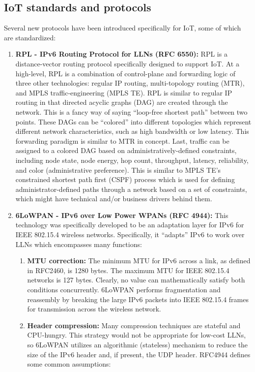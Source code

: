 \subsection{IoT standards and protocols}
Several new protocols have been introduced specifically for IoT, some of which
are standardized:

\begin{enumerate}
  \item \textbf{RPL - IPv6 Routing Protocol for LLNs (RFC 6550):} RPL is a
  distance-vector routing protocol specifically designed to support IoT. At a
  high-level, RPL is a combination of control-plane and forwarding logic of
  three other technologies: regular IP routing, multi-topology routing (MTR),
  and MPLS traffic-engineering (MPLS TE). RPL is similar to regular IP routing
  in that directed acyclic graphs (DAG) are created through the network. This
  is a fancy way of saying ``loop-free shortest path'' between two points.
  These DAGs can be ``colored'' into different topologies which represent
  different network characteristics, such as high bandwidth or low latency.
  This forwarding paradigm is similar to MTR in concept. Last, traffic can be
  assigned to a colored DAG based on administratively-defined constraints,
  including node state, node energy, hop count, throughput, latency,
  reliability, and color (administrative preference). This is similar to MPLS
  TE’s constrained shortest path first (CSPF) process which is used for
  defining administrator-defined paths through a network based on a set of
  constraints, which might have technical and/or business drivers behind them.
  \item \textbf{6LoWPAN - IPv6 over Low Power WPANs (RFC 4944):} This
  technology was specifically developed to be an adaptation layer for IPv6 for
  IEEE 802.15.4 wireless networks. Specifically, it ``adapts'' IPv6 to work
  over LLNs which encompasses many functions:

  \begin{enumerate}
    \item \textbf{MTU correction:} The minimum MTU for IPv6 across a link, as
	defined in RFC2460, is 1280 bytes. The maximum MTU for IEEE 802.15.4 networks
	is 127 bytes. Clearly, no value can mathematically satisfy both conditions
	concurrently. 6LoWPAN performs fragmentation and reassembly by breaking the
	large IPv6 packets into IEEE 802.15.4 frames for transmission across the
	wireless network.
    \item \textbf{Header compression:} Many compression techniques are
	stateful and CPU-hungry. This strategy would not be appropriate for low-cost
	LLNs, so 6LoWPAN utilizes an algorithmic (stateless) mechanism to reduce the
	size of the IPv6 header and, if present, the UDP header. RFC4944 defines some
	common assumptions:


\end{enumerate}
\end{enumerate}

